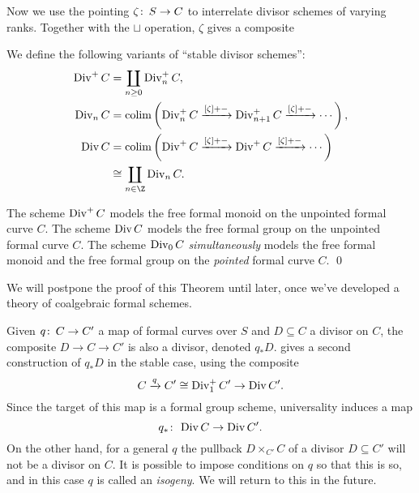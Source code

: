 Now we use the pointing $\zeta\colon\thinspace S \to C$ to interrelate divisor schemes of varying ranks.  Together with the $\sqcup$ operation, $\zeta$ gives a composite
\begin{center}
\end{center}

\begin{definition}\label{StableDivisorSchemeDefn}
We define the following variants of ``stable divisor schemes'':
\begin{align*}
\Div^+ C & = \coprod_{n \ge 0} \Div_n^+ C, \\
\Div_n C & = \colim \left( \Div_n^+ C \xrightarrow{[\zeta] + -} \Div_{n+1}^+ C \xrightarrow{[\zeta] + -} \cdots \right), \\
\Div C & = \colim \left( \Div^+ C \xrightarrow{[\zeta] + -} \Div^+ C \xrightarrow{[\zeta] + -} \cdots \right) \\
& \cong \coprod_{n \in \Z} \Div_n C.
\end{align*}
\end{definition}

\begin{theorem}\label{DivConstructionsAreFree}
The scheme $\operatorname{Div}^+ C$ models the free formal monoid on the unpointed formal curve $C$.  The scheme $\operatorname{Div} C$ models the free formal group on the unpointed formal curve $C$.  The scheme $\operatorname{Div}_0 C$ \emph{simultaneously} models the free formal monoid and the free formal group on the \emph{pointed} formal curve $C$. \qed
\end{theorem}
\noindent We will postpone the proof of this Theorem until later, once we've developed a theory of coalgebraic formal schemes.

\begin{remark}\label{DivHasPushforwards}
Given $q\colon\thinspace C \to C'$ a map of formal curves over $S$ and $D \subseteq C$ a divisor on $C$, the composite $D \to C \to C'$ is also a divisor, denoted $q_* D$.   gives a second construction of $q_* D$ in the stable case, using the composite \[C \xrightarrow{q} C' \cong \operatorname{Div}_1^+ C' \to \operatorname{Div} C'.\]  Since the target of this map is a formal group scheme, universality induces a map \[q_*\colon\thinspace \operatorname{Div} C \to \operatorname{Div} C'.\]  On the other hand, for a general $q$ the pullback $D \times_{C'} C$ of a divisor $D \subseteq C'$ will not be a divisor on $C$.  It is possible to impose conditions on $q$ so that this is so, and in this case $q$ is called an \textit{isogeny}.  We will return to this in the future.
\end{remark}

